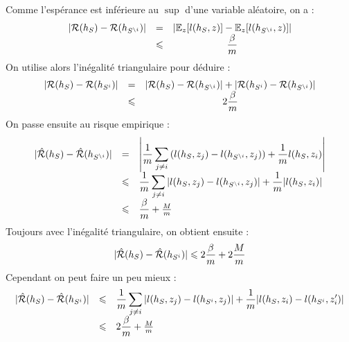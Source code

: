 
\dem
Comme l'espérance est inférieure au $\sup$ d'une variable aléatoire, on a :
$$ \begin{array}{llc}
	| \mathcal{R}(h_S) - \mathcal{R}(h_{S^{\setminus i}}) | & = & \left| \mathbb{E}_z[l(h_S, z)] - \mathbb{E}_z[l(h_{S^{\setminus i}}, z)] \right| \\
	 & \leqslant & \dfrac{\beta}{m}
\end{array} $$
On utilise alors l'inégalité triangulaire pour déduire :
$$ \begin{array}{llc}
| \mathcal{R}(h_S) - \mathcal{R}(h_{S^{i}}) | & = & | \mathcal{R}(h_S) - \mathcal{R}(h_{S^{\setminus i}}) | + | \mathcal{R}(h_{S^i}) - \mathcal{R}(h_{S^{\setminus i}}) | \\
& \leqslant & 2 \dfrac{\beta}{m}
\end{array} $$
On passe ensuite au risque empirique :
$$ \begin{array}{lll}
	| \hat{\mathcal{R}}(h_S) - \hat{\mathcal{R}}(h_{S^{\setminus i}}) |
	 & = & \left| \displaystyle \dfrac{1}{m} \sum_{j \neq i} \left( l(h_S, z_j) - l(h_{S^{\setminus i}}, z_j) \right) + \dfrac{1}{m} l(h_S, z_i) \right| \\
	 & \leqslant & \displaystyle \dfrac{1}{m} \sum_{j \neq i} \left| l(h_S, z_j) - l(h_{S^{\setminus i}}, z_j) \right| + \dfrac{1}{m} | l(h_S, z_i) | \\
	 & \leqslant & \dfrac{\beta}{m} + \frac{M}{m}
\end{array}$$
Toujours avec l'inégalité triangulaire, on obtient ensuite :
$$ | \hat{\mathcal{R}}(h_S) - \hat{\mathcal{R}}(h_{S^{i}}) | \leqslant 2 \dfrac{\beta}{m} + 2 \dfrac{M}{m} $$
Cependant on peut faire un peu mieux :
$$ \begin{array}{lll}
	| \hat{\mathcal{R}}(h_S) - \hat{\mathcal{R}}(h_{S^{i}}) |
	& \leqslant & \displaystyle \dfrac{1}{m} \sum_{j \neq i} \left| l(h_S, z_j) - l(h_{S^{ i}}, z_j) \right| + \dfrac{1}{m} | l(h_S, z_i) - l(h_{S^i}, z_i^\prime) | \\
	& \leqslant & 2 \dfrac{\beta}{m} + \frac{M}{m}
\end{array}$$
